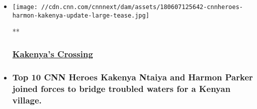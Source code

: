 \begin{itemize}
\item
  \href{/videos/world/2018/06/07/cnnheroes-harmon-kakenya-update.cnn}{}

  \texttt{[image: //cdn.cnn.com/cnnnext/dam/assets/180607125642-cnnheroes-harmon-kakenya-update-large-tease.jpg]}

  **

  \hypertarget{kakenyas-crossing}{%
  \subsubsection{\texorpdfstring{\href{/videos/world/2018/06/07/cnnheroes-harmon-kakenya-update.cnn}{Kakenya's
  Crossing}}{Kakenya's Crossing}}\label{kakenyas-crossing}}
\item
  \hypertarget{top-10-cnn-heroes-kakenya-ntaiya-and-harmon-parker-joined-forces-to-bridge-troubled-waters-for-a-kenyan-village-}{%
  \subsubsection{Top 10 CNN Heroes Kakenya Ntaiya and Harmon Parker
  joined forces to bridge troubled waters for a Kenyan village.
  }\label{top-10-cnn-heroes-kakenya-ntaiya-and-harmon-parker-joined-forces-to-bridge-troubled-waters-for-a-kenyan-village-}}
\end{itemize}

